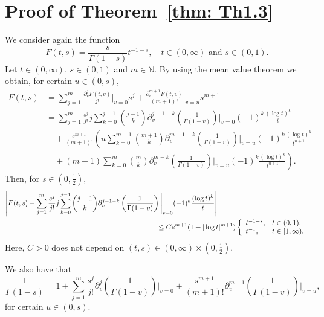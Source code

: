 \documentclass[a4paper,10pt, reqno]{amsart}
\theoremstyle{definition}
\theoremstyle{remark}
\numberwithin{equation}{section}
\begin{document}

\section{Proof of Theorem~\ref{thm: Th1.3}}\label{sec: proof Th1.3}

We consider again the function
\[
F(t,s)=\frac{s}{\Gamma (1-s)}t^{-1-s},\quad t\in (0,\infty)\mbox{ and }s\in (0,1).
\]
Let $t\in (0,\infty)$, $s\in (0,1)$ and $m\in \mathbb N$. By using the mean value theorem we obtain, for certain $u\in (0,s)$,
\begin{align*}
    F(t,s)&=\sum_{j=1}^m\frac{\partial_v^jF(t,v)}{j!}\Bigg|_{v=0}s^j+\frac{\partial_v^{m+1}F(t,v)}{(m+1)!}\Bigg|_{v=u}s^{m+1}\\
    &=\sum_{j=1}^m\frac{s^j}{j!}j\sum_{k=0}^{j-1}\binom{j-1}{k}\partial_v^{j-1-k}\left(\frac{1}{\Gamma (1-v)}\right)\Bigg|_{v=0}(-1)^k\frac{(\log t)^k}{t}\\
    &\quad +\frac{s^{m+1}}{(m+1)!}\left(u\sum_{k=0}^{m+1}\binom{m+1}{k}
    \partial_v^{m+1-k}\left(\frac{1}{\Gamma (1-v)}\right)\Bigg|_{v=u}(-1)^k\frac{(\log t)^k}{t^{u+1}}\right.\\
    &\quad +\left.(m+1)\sum_{k=0}^m\binom{m}{k}\partial_v^{m-k}\left(\frac{1}{\Gamma (1-v)}\right)\Bigg|_{v=u}(-1)^k\frac{(\log t)^k}{t^{u+1}}\right).
\end{align*}
Then, for $s\in (0,\tfrac12)$,
\begin{align*}
    \left|F(t,s)-\sum_{j=1}^m\frac{s^j}{j!}j\sum_{k=0}^{j-1}\binom{j-1}{k}\partial_v^{j-1-k}\left(\frac{1}{\Gamma (1-v)}\right)\Bigg|_{v=0}(-1)^k\frac{(\log t)^k}{t}\right|&\\
    &\hspace{-3cm}\leq Cs^{m+1}(1+|\log t|^{m+1})\left\{\begin{array}{ll}
    t^{-1-s},&t\in (0,1),\\
    t^{-1},&t\in [1,\infty).
    \end{array}
    \right.
    \end{align*}
Here, $C>0$ does not depend on $(t,s)\in (0,\infty)\times (0,\tfrac12)$.

We also have that
\[
\frac{1}{\Gamma (1-s)}=1+\sum_{j=1}^m\frac{s^j}{j!}\partial_v^{j}\left(\frac{1}{\Gamma (1-v)}\right)\Bigg|_{v=0}+\frac{s^{m+1}}{(m+1)!}\partial_v^{m+1}\left(\frac{1}{\Gamma (1-v)}\right)\Bigg|_{v=u},
\]
for certain $u\in (0,s)$.
\end{document}
